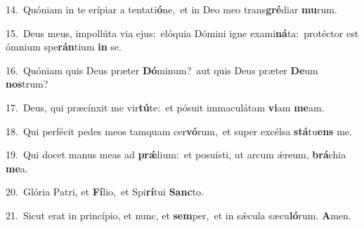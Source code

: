 {\numbfont\textcolor{\numbcolor}{14.}}~Quóniam in te erípiar a tentati\-\textbf{ó}\-ne,~\star et in Deo meo trans\-\textbf{gré}\-diar \textbf{mu}\-rum.\par
{\numbfont\textcolor{\numbcolor}{15.}}~Deus meus, impollúta via ejus:~\dagger elóquia Dómini igne exami\-\textbf{ná}\-ta:~\star protéctor est ómnium spe\-\textbf{rán}\-tium \textbf{in} se.\par
{\numbfont\textcolor{\numbcolor}{16.}}~Quóniam quis Deus præter \textbf{Dó}\-minum?~\star aut quis Deus præter \textbf{De}\-um \textbf{nos}\-trum?\par
{\numbfont\textcolor{\numbcolor}{17.}}~Deus, qui præcínxit me vir\-\textbf{tú}\-te:~\star et pósuit immaculátam \textbf{vi}\-am \textbf{me}\-am.\par
{\numbfont\textcolor{\numbcolor}{18.}}~Qui perfécit pedes meos tamquam cer\-\textbf{vó}\-rum,~\star et super excélsa \textbf{stá}\-tu\textbf{ens} me.\par
{\numbfont\textcolor{\numbcolor}{19.}}~Qui docet manus meas ad \textbf{prǽ}\-lium:~\star et posuísti, ut arcum ǽreum, \textbf{brá}\-chia \textbf{me}\-a.\par
{\numbfont\textcolor{\numbcolor}{20.}}~Glória Patri, et \textbf{Fí}\-lio,~\star et Spi\-\textbf{rí}\-tui \textbf{Sanc}\-to.\par
{\numbfont\textcolor{\numbcolor}{21.}}~Sicut erat in princípio, et nunc, et \textbf{sem}\-per,~\star et in sǽcula sæcu\-\textbf{ló}\-rum. \textbf{A}\-men.\par
